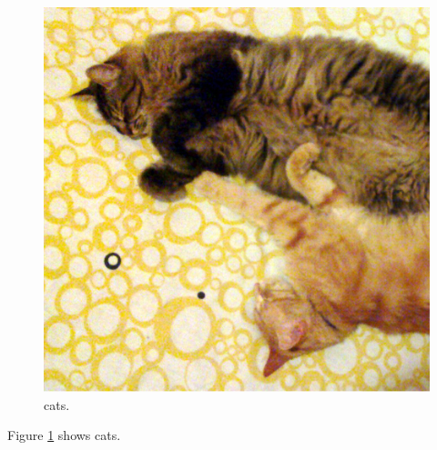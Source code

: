 \documentclass{article}
\begin{document}
\begin{figure}
  \includegraphics[width=\linewidth]{cats}
  \caption{cats.}
  \label{fig:cats}
\end{figure}

Figure \ref{fig:cats} shows cats.
\end{document}
